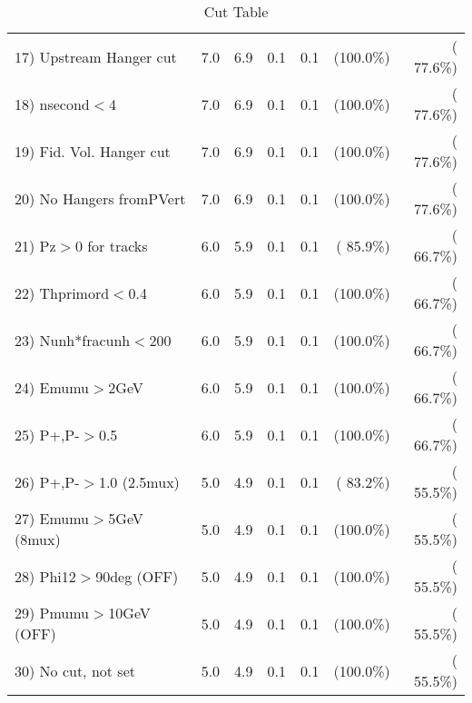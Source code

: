 \begin{table}[h!]
\begin{tabular}{||l||r|r|r|r|r|r||}
 17) Upstream Hanger cut  &          7.0 &          6.9 &          0.1 &          0.1 & (100.0\%) & ( 77.6\%) \\
 18) nsecond$<$4          &          7.0 &          6.9 &          0.1 &          0.1 & (100.0\%) & ( 77.6\%) \\
 19) Fid. Vol. Hanger cut &          7.0 &          6.9 &          0.1 &          0.1 & (100.0\%) & ( 77.6\%) \\
 20) No Hangers fromPVert &          7.0 &          6.9 &          0.1 &          0.1 & (100.0\%) & ( 77.6\%) \\
 21) Pz$>$0 for tracks    &          6.0 &          5.9 &          0.1 &          0.1 & ( 85.9\%) & ( 66.7\%) \\
 22) Thprimord$<$0.4      &          6.0 &          5.9 &          0.1 &          0.1 & (100.0\%) & ( 66.7\%) \\
 23) Nunh*fracunh$<$200   &          6.0 &          5.9 &          0.1 &          0.1 & (100.0\%) & ( 66.7\%) \\
 24) Emumu$>$2GeV         &          6.0 &          5.9 &          0.1 &          0.1 & (100.0\%) & ( 66.7\%) \\
 25) P+,P-$>$0.5          &          6.0 &          5.9 &          0.1 &          0.1 & (100.0\%) & ( 66.7\%) \\
 26) P+,P-$>$1.0 (2.5mux) &          5.0 &          4.9 &          0.1 &          0.1 & ( 83.2\%) & ( 55.5\%) \\
 27) Emumu$>$5GeV  (8mux) &          5.0 &          4.9 &          0.1 &          0.1 & (100.0\%) & ( 55.5\%) \\
 28) Phi12$>$90deg  (OFF) &          5.0 &          4.9 &          0.1 &          0.1 & (100.0\%) & ( 55.5\%) \\
 29) Pmumu$>$10GeV  (OFF) &          5.0 &          4.9 &          0.1 &          0.1 & (100.0\%) & ( 55.5\%) \\
 30) No cut, not set      &          5.0 &          4.9 &          0.1 &          0.1 & (100.0\%) & ( 55.5\%) \\
 \hline
 \hline
 \end{tabular}
 \caption{Cut Table           }
 \label{tab-cutcohjpsi-mumu_anuecc}
 \end{table}
